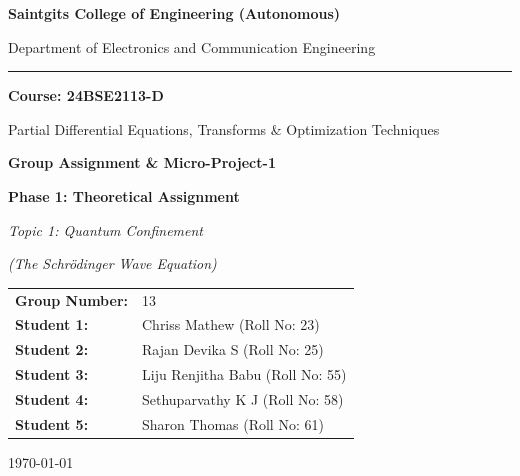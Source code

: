 \documentclass[12pt, a4paper]{article}
\newcommand{\groupNumber}{13}
\newcommand{\studentOneName}{Chriss Mathew}
\newcommand{\studentOneRoll}{23}
\newcommand{\studentTwoName}{Rajan Devika S}
\newcommand{\studentTwoRoll}{25}
\newcommand{\studentThreeName}{Liju Renjitha Babu}
\newcommand{\studentThreeRoll}{55}
\newcommand{\studentFourName}{Sethuparvathy K J}
\newcommand{\studentFourRoll}{58}
\newcommand{\studentFiveName}{Sharon Thomas}
\newcommand{\studentFiveRoll}{61}
\begin{document}
\begin{titlepage}
    \centering
    \vspace*{1cm}

    {\large \textbf{Saintgits College of Engineering (Autonomous)}\par}
    {\large Department of Electronics and Communication Engineering\par}
    \vspace{0.3cm}
    \rule{\linewidth}{0.5pt}
    \vspace{0.5cm}

    {\Large \textbf{Course: 24BSE2113-D}\par}
    {\large Partial Differential Equations, Transforms \& Optimization Techniques\par}
    \vspace{1cm}

    {\Large \textbf{Group Assignment \& Micro-Project-1}\par}
    \vspace{0.2cm}
    {\Large \textbf{Phase 1: Theoretical Assignment}\par}
    \vspace{1cm}

    {\Large \textit{Topic 1: Quantum Confinement}\par}
    {\Large \textit{(The Schr\"odinger Wave Equation)}\par}

    \vfill

    \begin{center}
    \begin{tabular}{ll}
        \textbf{Group Number:} & \groupNumber \\[4pt]
        \textbf{Student 1:} & \studentOneName \; (Roll No: \studentOneRoll) \\[2pt]
        \textbf{Student 2:} & \studentTwoName \; (Roll No: \studentTwoRoll) \\[2pt]
        \textbf{Student 3:} & \studentThreeName \; (Roll No: \studentThreeRoll) \\[2pt]
        \textbf{Student 4:} & \studentFourName \; (Roll No: \studentFourRoll) \\[2pt]
        \textbf{Student 5:} & \studentFiveName \; (Roll No: \studentFiveRoll) \\
    \end{tabular}
    \end{center}

    \vfill
    {\large \today\par}
\end{titlepage}
\end{document}
